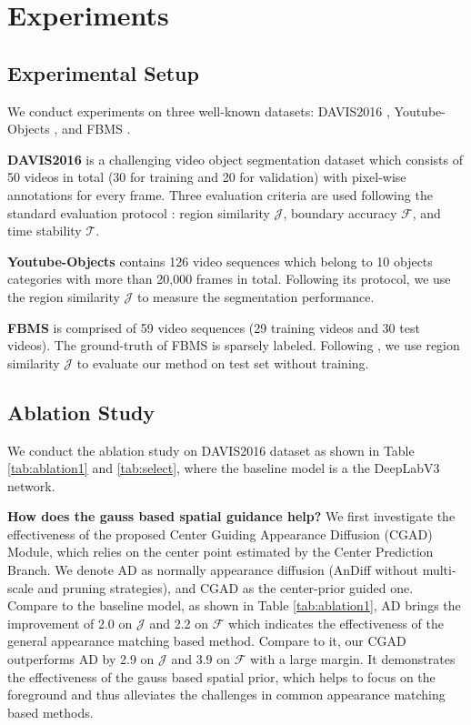 \documentclass[letterpaper]{article} \usepackage{aaai20}  \usepackage{times}  \usepackage{helvet} \usepackage{courier}  \usepackage[hyphens]{url}  \usepackage{graphicx} \urlstyle{rm} \def\UrlFont{\rm}  \usepackage{graphicx}  \frenchspacing  \setlength{\pdfpagewidth}{8.5in}  \setlength{\pdfpageheight}{11in}  \usepackage{amssymb}
\begin{document}
\section{Experiments}
\subsection{Experimental Setup}
We conduct experiments on three well-known datasets: DAVIS2016 \cite{perazzi2016benchmark}, Youtube-Objects \cite{prest2012learning}, and FBMS \cite{ochs2013segmentation}.

\noindent \textbf{DAVIS2016} is a challenging video object segmentation dataset which consists of 50 videos in total (30 for training and 20 for validation) with pixel-wise annotations for every frame. Three evaluation criteria are used following the standard evaluation protocol \cite{perazzi2016benchmark}: region similarity $\mathcal{J}$, boundary accuracy $\mathcal{F}$, and time stability $\mathcal{T}$.

\noindent \textbf{Youtube-Objects} contains 126 video sequences which belong to 10 objects categories with more than 20,000 frames in total. Following its protocol, we use the region similarity $\mathcal{J}$ to measure the segmentation performance.

\noindent \textbf{FBMS} is comprised of 59 video sequences (29 training videos and 30 test videos). The ground-truth of FBMS is sparsely labeled. Following \cite{yang2019anchor,lu2019see,zhou2020motion}, we use region similarity $\mathcal{J}$ to evaluate our method on test set without training.



\subsection{Ablation Study}
We conduct the ablation study on DAVIS2016 dataset as shown in Table \ref{tab:ablation1} and \ref{tab:select}, where the baseline model is a the DeepLabV3 network.

\noindent \textbf{How does the gauss based spatial guidance help?}
We first investigate the effectiveness of the proposed Center Guiding Appearance Diffusion (CGAD) Module, which relies on the center point estimated by the Center Prediction Branch. We denote AD as normally appearance diffusion (AnDiff without multi-scale and pruning strategies), and CGAD as the center-prior guided one. Compare to the baseline model, as shown in Table \ref{tab:ablation1}, AD brings the improvement of 2.0 on $\mathcal{J}$ and 2.2 on $\mathcal{F}$ which indicates the effectiveness of the general appearance matching based method. Compare to it, our CGAD outperforms AD by 2.9 on $\mathcal{J}$ and 3.9 on $\mathcal{F}$ with a large margin. It demonstrates the effectiveness of the gauss based spatial prior, which helps to focus on the foreground and thus alleviates the challenges in common appearance matching based methods.
\end{document}
